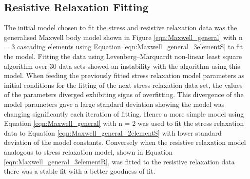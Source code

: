 \subsection{Resistive Relaxation Fitting}
\label{subsec:resistive relaxation Fitting}
The initial model chosen to fit the stress and resistive relaxation data was the generalised Maxwell body model shown in Figure \ref{eqn:Maxwell_general} with n = 3 cascading elements using Equation \ref{eqn:Maxwell_general_3elementS} to fit the model. Fitting the data using Levenberg–Marquardt non-linear least square algorithm over 30 data sets showed an instability with the algorithm using this model. When feeding the previously fitted stress relaxation model parameters as initial conditions for the fitting of the next stress relaxation data set, the values of the parameters diverged exhibiting signs of overfitting. This divergence of the model parameters gave a large standard deviation showing the model was changing significantly each iteration of fitting. Hence a more simple model using Equation \ref{eqn:Maxwell_general} with n = 2 was used to fit the stress relaxation data to Equation \ref{eqn:Maxwell_general_2elementS} with lower standard deviation of the model constants. Conversely when the resistive relaxation model analogous to stress relaxation model, shown in Equation \ref{eqn:Maxwell_general_3elementR}, was fitted to the resistive relaxation data there was a stable fit with a better goodness of fit.

